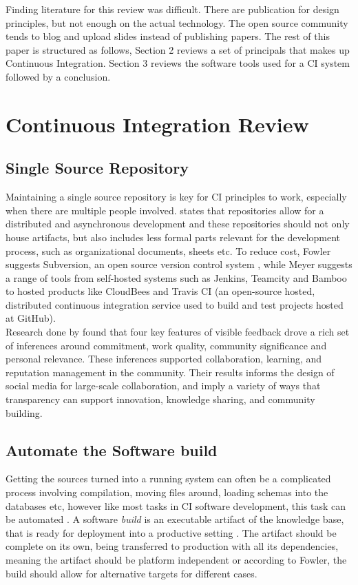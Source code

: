 \documentclass [titlepage,11pt]{article}
\begin{document}
Finding literature for this review was difficult. There are publication for design principles, but not enough on the actual technology. The open source community tends to blog and upload slides instead of publishing papers. The rest of this paper is structured as follows, Section 2 reviews a set of principals that makes up Continuous Integration. Section 3 reviews the software tools used for a CI system followed by a conclusion. 
\clearpage

\section{Continuous Integration Review}
\subsection{Single Source Repository}
Maintaining a single source repository is key for CI principles to work, especially when there are multiple people involved. \citep{joachim11} states that repositories allow for a distributed and asynchronous development and these repositories should not only house artifacts, but also includes less formal parts relevant for the development process, such as organizational documents, sheets etc. To reduce cost, Fowler suggests Subversion, an open source version control system \citep{subversion00}, while Meyer suggests a range of tools from self-hosted systems such as Jenkins, Teamcity and Bamboo to hosted products like CloudBees and Travis CI (an open-source hosted, distributed continuous integration service used to build and test projects hosted at GitHub). \\

Research done by \citep{dabbish12} found that four key features of visible feedback drove a rich set of inferences around commitment, work quality, community significance and personal relevance. These inferences supported collaboration, learning, and reputation management in the community. Their results informs the design of social media for large-scale collaboration, and imply a variety of ways that transparency can support innovation, knowledge sharing, and community building.

\subsection{Automate the Software build}
Getting the sources turned into a running system can often be a complicated process involving compilation, moving files around, loading schemas into the databases etc, however like most tasks in CI software development, this task can be automated \citep{fowler06}. A software {\it build} is an executable artifact of the knowledge base, that is ready for deployment into a productive setting \citep{joachim11}. The artifact should be complete on its own, being transferred to production with all its dependencies, meaning the artifact should be platform independent or according to Fowler, the build should allow for alternative targets for different cases.
\end{document}
